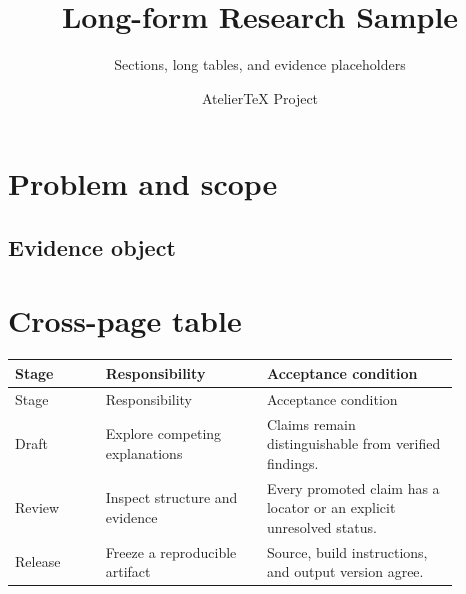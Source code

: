 \documentclass[profile=academic]{atelier}
\title{Long-form Research Sample}
\subtitle{Sections, long tables, and evidence placeholders}
\author{AtelierTeX Project}
\begin{document}
\maketitle
\tableofcontents

\section{Problem and scope}

\subsection{Evidence object}

\section{Cross-page table}
\begin{longtable}{p{0.18\linewidth}p{0.32\linewidth}p{0.38\linewidth}}
\toprule
Stage & Responsibility & Acceptance condition \\
\midrule
\endfirsthead
\toprule
Stage & Responsibility & Acceptance condition \\
\midrule
\endhead
Draft & Explore competing explanations & Claims remain distinguishable from verified findings. \\
Review & Inspect structure and evidence & Every promoted claim has a locator or an explicit unresolved status. \\
Release & Freeze a reproducible artifact & Source, build instructions, and output version agree. \\
\bottomrule
\end{longtable}
\end{document}
